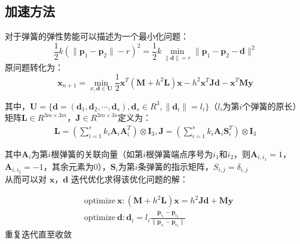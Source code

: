 \documentclass[14pt]{scrartcl} %
\begin{document}
\subsection{加速方法\cite{Fast}}
对于弹簧的弹性势能可以描述为一个最小化问题：
\begin{equation}
\frac{1}{2}k(\|\boldsymbol  p_1-\boldsymbol p_2\|-r)^2=\frac{1}{2}k\min\limits_{\|\boldsymbol d\|=r}\|\boldsymbol p_1-\boldsymbol p_2-\boldsymbol  d\|^2
\end{equation}
原问题转化为：
\begin{equation}
\boldsymbol x_{n+1}=\min\limits_{x,\boldsymbol d\in \boldsymbol U}\frac{1}{2} \boldsymbol x^T(\boldsymbol M+h^2\boldsymbol L)\boldsymbol x-h^2\boldsymbol x^T\boldsymbol J\boldsymbol d-\boldsymbol x^T\boldsymbol M\boldsymbol y
\end{equation}

其中，$\boldsymbol U=\{\boldsymbol d=(\boldsymbol d_1,\boldsymbol d_2,\cdots,\boldsymbol d_s),\boldsymbol d_s\in R^3,\|\boldsymbol d_i\|=l_i\}$（$l_i$为第$i$个弹簧的原长）\\

矩阵$\boldsymbol L\in R^{3m\times 3m}$，$\boldsymbol J\in R^{3m\times 3s}$定义为：
\begin{equation}
\begin{aligned}
\boldsymbol L=\left(\sum\limits_{i=1}^sk_i\boldsymbol A_i\boldsymbol A_i^T\right)\otimes\boldsymbol I_3,
\boldsymbol J=\left(\sum\limits_{i=1}^sk_i\boldsymbol A_i\boldsymbol S_i^T\right)\otimes \boldsymbol I_3
\end{aligned}
\end{equation}

其中$\boldsymbol A_i$为第$i$根弹簧的关联向量（如第$i$根弹簧端点序号为$i_1$和$i_2$，则$\boldsymbol A_{i,i_1}=1$，$\boldsymbol A_{i,i_2}=-1$，其余元素为0），$\boldsymbol S_i$为第$i$条弹簧的指示矩阵，$S_{i,j}=\delta_{i,j}$\\

从而可以对 $\boldsymbol x$，$\boldsymbol d$ 迭代优化求得该优化问题的解：

\begin{equation}
\begin{aligned}
&\mathrm{optimize}\ \boldsymbol x:(\boldsymbol M+h^2\boldsymbol L)\boldsymbol x=h^2\boldsymbol J\boldsymbol d+\boldsymbol M\boldsymbol y\\
&\mathrm{optimize}\ \boldsymbol d:\boldsymbol d_i=l_i\frac{\boldsymbol p_{i_1}-\boldsymbol p_{i_2}}{\|\boldsymbol p_{i_1}-\boldsymbol p_{i_2}\|}
\end{aligned}
\end{equation}
重复迭代直至收敛
\end{document}
